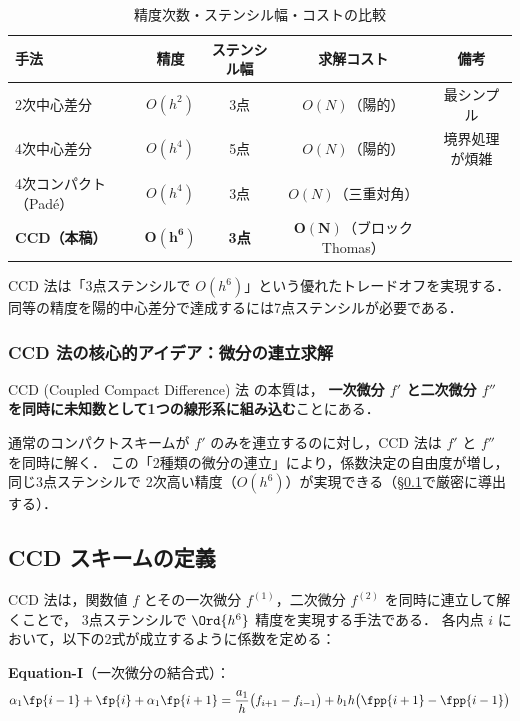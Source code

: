 \begin{table}[h]
\caption{精度次数・ステンシル幅・コストの比較}
\begin{center}
\renewcommand{\arraystretch}{1.3}
\begin{tabular}{lcccc}
\hline
手法 & 精度 & ステンシル幅 & 求解コスト & 備考 \\
\hline
2次中心差分 & $O(h^2)$ & 3点 & $O(N)$（陽的） & 最シンプル \\
4次中心差分 & $O(h^4)$ & 5点 & $O(N)$（陽的） & 境界処理が煩雑 \\
4次コンパクト（Padé） & $O(h^4)$ & 3点 & $O(N)$（三重対角） & \cite{Lele1992} \\
\textbf{CCD（本稿）} & $\bm{O(h^6)}$ & \textbf{3点} & $\bm{O(N)}$（ブロック Thomas） & \cite{ChuFan1998} \\
\hline
\end{tabular}
\end{center}
CCD 法は「3点ステンシルで $O(h^6)$」という優れたトレードオフを実現する．
同等の精度を陽的中心差分で達成するには7点ステンシルが必要である．
\end{table}

\subsubsection{CCD 法の核心的アイデア：微分の連立求解}

CCD (Coupled Compact Difference) 法 \cite{ChuFan1998} の本質は，
\textbf{一次微分 $f'$ と二次微分 $f''$ を同時に未知数として1つの線形系に組み込む}ことにある．

通常のコンパクトスキームが $f'$ のみを連立するのに対し，CCD 法は $f'$ と $f''$ を同時に解く．
この「2種類の微分の連立」により，係数決定の自由度が増し，同じ3点ステンシルで
2次高い精度（$O(h^6)$）が実現できる（§\ref{sec:ccd_def}で厳密に導出する）．

\subsection{CCD スキームの定義}
\label{sec:ccd_def}

CCD 法は，関数値 $f$ とその一次微分 $f^{(1)}$，二次微分 $f^{(2)}$ を同時に連立して解くことで，
3点ステンシルで $\Ord{h^6}$ 精度を実現する手法である．
各内点 $i$ において，以下の2式が成立するように係数を定める：

\noindent\textbf{Equation-I}（一次微分の結合式）：
\begin{equation}
  \alpha_1\fp{i-1} + \fp{i} + \alpha_1\fp{i+1}
  = \frac{a_1}{h}\bigl(f_{i+1}-f_{i-1}\bigr)
  + b_1 h\bigl(\fpp{i+1}-\fpp{i-1}\bigr)
  \label{eq:CCD_I}
\end{equation}

